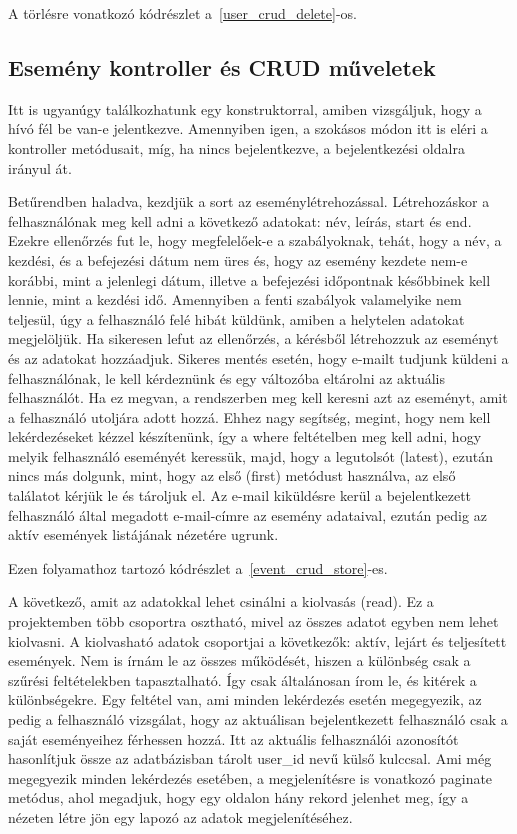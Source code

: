 \documentclass[
]{thesis-ekf}
\theoremstyle{definition}
\theoremstyle{remark}
\begin{document}
	A törlésre vonatkozó kódrészlet a~\ref{user_crud_delete}-os.
	
	
	
	\subsection{Esemény kontroller és CRUD műveletek}
	Itt is ugyanúgy találkozhatunk egy konstruktorral, amiben vizsgáljuk, hogy a hívó fél be van-e jelentkezve. Amennyiben igen, a szokásos módon itt is eléri a kontroller metódusait, míg, ha nincs bejelentkezve, a bejelentkezési oldalra irányul át.
	
	Betűrendben haladva, kezdjük a sort az eseménylétrehozással. Létrehozáskor a felhasználónak meg kell adni a következő adatokat: név, leírás, start és end. Ezekre ellenőrzés fut le, hogy megfelelőek-e a szabályoknak, tehát, hogy a név, a kezdési, és a befejezési dátum nem üres és, hogy az esemény kezdete nem-e korábbi, mint a jelenlegi dátum, illetve a befejezési időpontnak későbbinek kell lennie, mint a kezdési idő. Amennyiben a fenti szabályok valamelyike nem teljesül, úgy a felhasználó felé hibát küldünk, amiben a helytelen adatokat megjelöljük. Ha sikeresen lefut az ellenőrzés, a kérésből létrehozzuk az eseményt és az adatokat hozzáadjuk. Sikeres mentés esetén, hogy e-mailt tudjunk küldeni a felhasználónak, le kell kérdeznünk és egy változóba eltárolni az aktuális felhasználót. Ha ez megvan, a rendszerben meg kell keresni azt az eseményt, amit a felhasználó utoljára adott hozzá. Ehhez nagy segítség, megint, hogy nem kell lekérdezéseket kézzel készítenünk, így a where feltételben meg kell adni, hogy melyik felhasználó eseményét keressük, majd, hogy a legutolsót (latest), ezután nincs más dolgunk, mint, hogy az első (first) metódust használva, az első találatot kérjük le és tároljuk el. Az e-mail kiküldésre kerül a bejelentkezett felhasználó által megadott e-mail-címre az esemény adataival, ezután pedig az aktív események listájának nézetére ugrunk.
	
	Ezen folyamathoz tartozó kódrészlet a~\ref{event_crud_store}-es.
	
	
	
	A következő, amit az adatokkal lehet csinálni a kiolvasás (read). Ez a projektemben több csoportra osztható, mivel az összes adatot egyben nem lehet kiolvasni. A kiolvasható adatok csoportjai a következők: aktív, lejárt és teljesített események. Nem is írnám le az összes működését, hiszen a különbség csak a szűrési feltételekben tapasztalható. Így csak általánosan írom le, és kitérek a különbségekre. Egy feltétel van, ami minden lekérdezés esetén megegyezik, az pedig a felhasználó vizsgálat, hogy az aktuálisan bejelentkezett felhasználó csak a saját eseményeihez férhessen hozzá. Itt az aktuális felhasználói azonosítót hasonlítjuk össze az adatbázisban tárolt user\_id nevű külső kulccsal. Ami még megegyezik minden lekérdezés esetében, a megjelenítésre is vonatkozó paginate metódus, ahol megadjuk, hogy egy oldalon hány rekord jelenhet meg, így a nézeten létre jön egy lapozó az adatok megjelenítéséhez.
	
\end{document}
